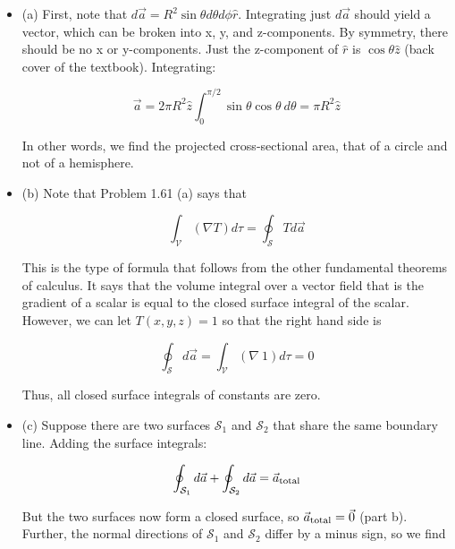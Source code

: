 \documentclass[10pt]{article}
\begin{document}
\begin{itemize}

\item (a) First, note that $d\vec{a} = R^2 \sin\theta d\theta d\phi \hat{r}$.  Integrating just $d\vec{a}$ should yield a vector, which can be broken into x, y, and z-components.  By symmetry, there should be no x or y-components.  Just the z-component of $\hat{r}$ is $\cos\theta \hat{z}$ (back cover of the textbook). Integrating:

\begin{equation}
\vec{a} = 2 \pi R^2 \hat{z} \int_{0}^{\pi/2} \sin\theta\cos\theta ~ d\theta = \pi R^2 \hat{z}
\end{equation}

In other words, we find the projected cross-sectional area, that of a circle and not of a hemisphere.

\item (b) Note that Problem 1.61 (a) says that

\begin{equation}
\int_{\mathcal{V}} (\nabla T) d\tau = \oint_{\mathcal{S}} T d\vec{a}
\end{equation}

This is the type of formula that follows from the other fundamental theorems of calculus.  It says that the volume integral over a vector field that is the gradient of a scalar is equal to the closed surface integral of the scalar.  However, we can let $T(x,y,z) = 1$ so that the right hand side is 

\begin{equation}
\oint_{\mathcal{S}} d\vec{a} = \int_{\mathcal{V}} (\nabla ~ 1) d\tau = 0
\end{equation}

Thus, all closed surface integrals of constants are zero.

\item (c)  Suppose there are two surfaces $\mathcal{S}_1$ and $\mathcal{S}_2$ that share the same boundary line.  Adding the surface integrals:

\begin{equation}
\oint_{\mathcal{S}_1} d\vec{a} + \oint_{\mathcal{S}_2} d\vec{a} = \vec{a}_{\rm total}
\end{equation}

But the two surfaces now form a closed surface, so $\vec{a}_{\rm total} = \vec{0}$ (part b).  Further, the normal directions of $\mathcal{S}_1$ and $\mathcal{S}_2$ differ by a minus sign, so we find


\end{itemize}
\end{document}
